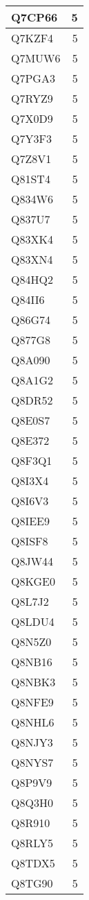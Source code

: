 \documentclass[
]{book}
\theoremstyle{definition}
\theoremstyle{definition}
\theoremstyle{definition}
\theoremstyle{definition}
\theoremstyle{remark}
\begin{document}
\begin{table}
\begin{tabular}{l|r}
\hline
Q7CP66 & 5\\
\hline
Q7KZF4 & 5\\
\hline
Q7MUW6 & 5\\
\hline
Q7PGA3 & 5\\
\hline
Q7RYZ9 & 5\\
\hline
Q7X0D9 & 5\\
\hline
Q7Y3F3 & 5\\
\hline
Q7Z8V1 & 5\\
\hline
Q81ST4 & 5\\
\hline
Q834W6 & 5\\
\hline
Q837U7 & 5\\
\hline
Q83XK4 & 5\\
\hline
Q83XN4 & 5\\
\hline
Q84HQ2 & 5\\
\hline
Q84II6 & 5\\
\hline
Q86G74 & 5\\
\hline
Q877G8 & 5\\
\hline
Q8A090 & 5\\
\hline
Q8A1G2 & 5\\
\hline
Q8DR52 & 5\\
\hline
Q8E0S7 & 5\\
\hline
Q8E372 & 5\\
\hline
Q8F3Q1 & 5\\
\hline
Q8I3X4 & 5\\
\hline
Q8I6V3 & 5\\
\hline
Q8IEE9 & 5\\
\hline
Q8ISF8 & 5\\
\hline
Q8JW44 & 5\\
\hline
Q8KGE0 & 5\\
\hline
Q8L7J2 & 5\\
\hline
Q8LDU4 & 5\\
\hline
Q8N5Z0 & 5\\
\hline
Q8NB16 & 5\\
\hline
Q8NBK3 & 5\\
\hline
Q8NFE9 & 5\\
\hline
Q8NHL6 & 5\\
\hline
Q8NJY3 & 5\\
\hline
Q8NYS7 & 5\\
\hline
Q8P9V9 & 5\\
\hline
Q8Q3H0 & 5\\
\hline
Q8R910 & 5\\
\hline
Q8RLY5 & 5\\
\hline
Q8TDX5 & 5\\
\hline
Q8TG90 & 5\\

\end{tabular}
\end{table}
\end{document}
